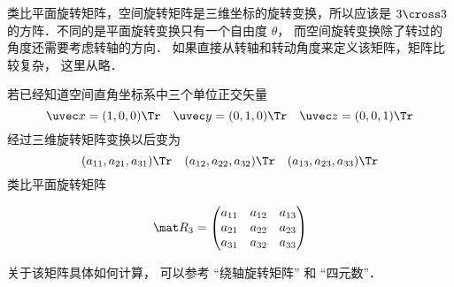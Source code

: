 


类比平面旋转矩阵，空间旋转矩阵是三维坐标的旋转变换，所以应该是 $3 \cross 3$ 的方阵．不同的是平面旋转变换只有一个自由度 $\theta $， 而空间旋转变换除了转过的角度还需要考虑转轴的方向． 如果直接从转轴和转动角度来定义该矩阵，矩阵比较复杂， 这里从略．

若已经知道空间直角坐标系中三个单位正交矢量
\begin{equation}
\uvec x=(1,0,0)\Tr \quad \uvec y=(0,1,0)\Tr \quad \uvec z=(0,0,1)\Tr
\end{equation}
 经过三维旋转矩阵变换以后变为 
\begin{equation}
({a_{11}},{a_{21}},{a_{31}})\Tr \quad ({a_{12}},{a_{22}},{a_{32}})\Tr \quad ({a_{13}},{a_{23}},{a_{33}})\Tr
\end{equation}
类比平面旋转矩阵

\begin{equation}
\mat R_3 = \begin{pmatrix}
{a_{11}}&{a_{12}}&{a_{13}}\\
{a_{21}}&{a_{22}}&{a_{23}}\\
{a_{31}}&{a_{32}}&{a_{33}}
\end{pmatrix}\end{equation}

关于该矩阵具体如何计算， 可以参考 “绕轴旋转矩阵” 和 “四元数”．


